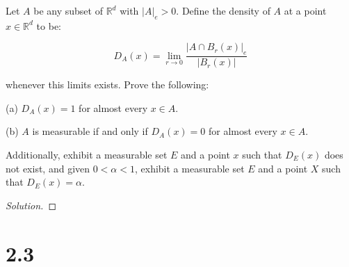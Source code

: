 \documentclass[10pt]{article}
\newenvironment{problem}[2][Problem]{\begin{trivlist}
\item[\hskip \labelsep {\bfseries #1}\hskip \labelsep {\bfseries #2.}]}{\end{trivlist}}
\begin{document}
\begin{problem}{5.5.19}

Let $A$ be any subset of $\mathbb{R}^d$ with $|A|_e > 0$. Define the density of $A$ at a point $x \in \mathbb{R}^d$ to be:

$$ D_A(x) = \lim_{r \to 0} \frac{|A \cap B_r(x)|_e}{|B_r(x)|} $$

whenever this limits exists. Prove the following:

(a) $D_A(x) = 1$ for almost every $x \in A$.

(b) $A$ is measurable if and only if $D_A(x) = 0$ for almost every $x \in A$.

Additionally, exhibit a measurable set $E$ and a point $x$ such that $D_E(x)$ does not exist, and given $0 < \alpha < 1$, exhibit a measurable set $E$ and a point $X$ such that $D_E(x) = \alpha$.

\end{problem}

\begin{proof}[Solution]

\end{proof}

\section*{2.3}
\end{document}
